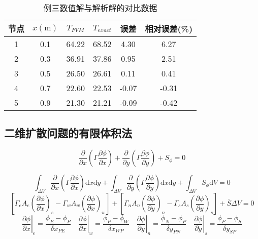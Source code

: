 \begin{table}[H]
  \begin{center}
  \caption{例三数值解与解析解的对比数据}
  \label{TbFV_ex3_compare}
  \begin{tabular}{|c|c|c|c|c|c|}
    \hline
    节点 & $x(\mathrm{m})$ & $T_{FVM}$ & $T_{exact}$ & 误差 & 相对误差(\%) \\
    \hline
    1 & 0.1 & 64.22 & 68.52 & 4.30 & 6.27 \\
    \hline
    2 & 0.3 & 36.91 & 37.86 & 0.95 & 2.51 \\
    \hline
    3 & 0.5 & 26.50 & 26.61 & 0.11 & 0.41 \\
    \hline
    4 & 0.7 & 22.60 & 22.53 & -0.07 & -0.31 \\
    \hline
    5 & 0.9 & 21.30 & 21.21 & -0.09 & -0.42 \\
    \hline
  \end{tabular}
  \end{center}
\end{table}

\subsection{二维扩散问题的有限体积法}
\begin{equation}
\frac{\partial }{\partial x}
\left(
\Gamma \frac{\partial \phi}{\partial x}
\right)
+
\frac{\partial }{\partial y}
\left(
\Gamma \frac{\partial \phi}{\partial y}
\right)
+
S_{\phi}
=
0
\end{equation}

\begin{equation}
  \int_{\Delta V}\!
\frac{\partial }{\partial x}
\left(
\Gamma \frac{\partial \phi}{\partial x}
\right)
\mathrm{d}x\mathrm{d}y
+
  \int_{\Delta V}\!
\frac{\partial }{\partial y}
\left(
\Gamma \frac{\partial \phi}{\partial y}
\right)
\mathrm{d}x\mathrm{d}y
+
  \int_{\Delta V}\!
S_{\phi}
\mathrm{d}V
=
0
\end{equation}
\begin{equation}
  \left[
    \Gamma_{e} A_{e}
    \left(
      \frac{\partial \phi}{\partial x}
    \right)_{e}
    -
    \Gamma_{w} A_{w}
    \left(
      \frac{\partial \phi}{\partial x}
    \right)_{w}
  \right]
  +
  \left[
    \Gamma_{n} A_{n}
    \left(
      \frac{\partial \phi}{\partial y}
    \right)_{n}
    -
    \Gamma_{s} A_{s}
    \left(
      \frac{\partial \phi}{\partial y}
    \right)_{s}
  \right]
  +
  \overline{S}\Delta V
  =
  0
\end{equation}
\begin{equation}
  \left.\frac{\partial \phi}{\partial x}\right|_{e}=\frac{\phi_{E}-\phi_{P}}{\delta x_{PE}} 
    \quad
  \left.\frac{\partial \phi}{\partial x}\right|_{w}=\frac{\phi_{P}-\phi_{W}}{\delta x_{WP}} 
    \quad
  \left.\frac{\partial \phi}{\partial y}\right|_{n}=\frac{\phi_{N}-\phi_{P}}{\delta y_{PN}} 
    \quad
  \left.\frac{\partial \phi}{\partial y}\right|_{s}=\frac{\phi_{P}-\phi_{S}}{\delta y_{SP}} 
\end{equation}

